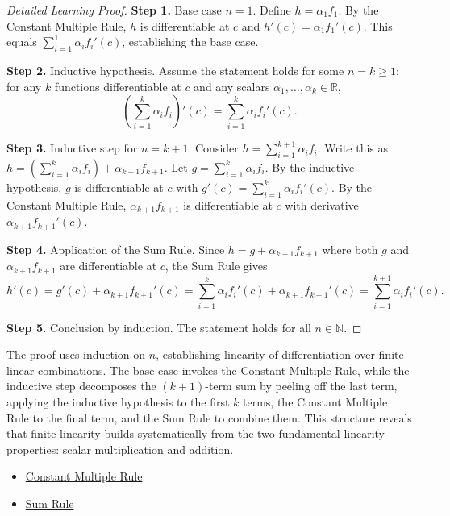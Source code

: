\begin{proof}[Detailed Learning Proof]
\LRAProofBodyStart

\textbf{Step 1.} Base case $n = 1$. Define $h = \alpha_1 f_1$. By the Constant Multiple Rule, $h$ is differentiable at $c$ and $h'(c) = \alpha_1 f_1'(c)$. This equals $\sum_{i=1}^{1} \alpha_i f_i'(c)$, establishing the base case.

\textbf{Step 2.} Inductive hypothesis. Assume the statement holds for some $n = k \geq 1$: for any $k$ functions differentiable at $c$ and any scalars $\alpha_1, \ldots, \alpha_k \in \mathbb{R}$,
\[
\left(\sum_{i=1}^{k} \alpha_i f_i\right)'(c) = \sum_{i=1}^{k} \alpha_i f_i'(c).
\]

\textbf{Step 3.} Inductive step for $n = k+1$. Consider $h = \sum_{i=1}^{k+1} \alpha_i f_i$. Write this as $h = \left(\sum_{i=1}^{k} \alpha_i f_i\right) + \alpha_{k+1} f_{k+1}$. Let $g = \sum_{i=1}^{k} \alpha_i f_i$. By the inductive hypothesis, $g$ is differentiable at $c$ with $g'(c) = \sum_{i=1}^{k} \alpha_i f_i'(c)$. By the Constant Multiple Rule, $\alpha_{k+1} f_{k+1}$ is differentiable at $c$ with derivative $\alpha_{k+1} f_{k+1}'(c)$.

\textbf{Step 4.} Application of the Sum Rule. Since $h = g + \alpha_{k+1} f_{k+1}$ where both $g$ and $\alpha_{k+1} f_{k+1}$ are differentiable at $c$, the Sum Rule gives
\[
h'(c) = g'(c) + \alpha_{k+1} f_{k+1}'(c) = \sum_{i=1}^{k} \alpha_i f_i'(c) + \alpha_{k+1} f_{k+1}'(c) = \sum_{i=1}^{k+1} \alpha_i f_i'(c).
\]

\textbf{Step 5.} Conclusion by induction. The statement holds for all $n \in \mathbb{N}$.
\end{proof}

\begin{remark*}
The proof uses induction on $n$, establishing linearity of differentiation over finite linear combinations. The base case invokes the Constant Multiple Rule, while the inductive step decomposes the $(k+1)$-term sum by peeling off the last term, applying the inductive hypothesis to the first $k$ terms, the Constant Multiple Rule to the final term, and the Sum Rule to combine them. This structure reveals that finite linearity builds systematically from the two fundamental linearity properties: scalar multiplication and addition.
\end{remark*}

\begin{dependencies}
\begin{itemize}
  \item \hyperref[thm:constant-multiple-rule]{Constant Multiple Rule}
  \item \hyperref[thm:sum-rule]{Sum Rule}
\end{itemize}
\end{dependencies}

\clearpage
